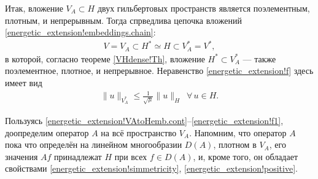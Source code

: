 \documentclass{report}
\begin{document}
Итак, вложение $V_A\subset H$ двух гильбертовых пространств является поэлементным, плотным, и непрерывным. Тогда спрведлива цепочка вложений \eqref{energetic_extension!embeddings.chain}:
\begin{gather}\label{energetic_extension!embeddings.chain-A}
V=V_A\subset H^*\simeq H\subset V^*_A=V^*,
\end{gather}
в которой, согласно теореме \ref{VHdense!Th}, вложение $H^*\subset V_A^*$ --- также поэлементное, плотное, и непрерывное. Неравенство \eqref{energetic_extension!f} здесь имеет вид
\begin{gather}\label{energetic_extension!f1}
\|u\|_{V^*_A}\leqslant \frac1{\sqrt\mu}\|u\|_H\,\,\,\forall\,u\in H.
\end{gather}

Пользуясь \eqref{energetic_extension!VAtoHemb.cont}--\eqref{energetic_extension!f1}, доопределим оператор $A$ на всё пространство $V_A$. Напомним, что оператор $A$ пока что определён на
линейном многообразии $D(A)$, плотном в $V_A$, его значения $Af$ принадлежат $H$ при всех $f\in D(A)$, и, кроме того, он обладает свойствами \eqref{energetic_extension!simmetricity},
\eqref{energetic_extension!positive}.
\end{document}
